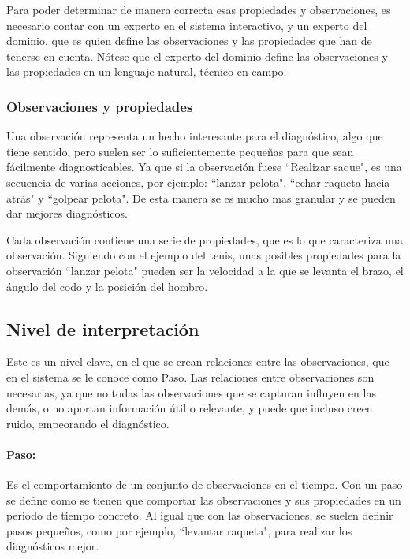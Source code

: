 Para poder determinar de manera correcta esas propiedades y observaciones, es necesario contar con un 
experto en el sistema interactivo, y un experto del dominio, que es quien define las observaciones y las
propiedades que han de tenerse en cuenta. N\'otese que el experto del dominio define las observaciones y las
propiedades en un lenguaje natural, t\'ecnico en campo.

\subsubsection{Observaciones y propiedades}
Una observaci\'on representa un hecho interesante para el diagn\'ostico, algo que tiene sentido, pero suelen
ser lo suficientemente peque\~nas para que sean f\'acilmente diagnosticables. Ya que si la observaci\'on
fuese ``Realizar saque", es una secuencia de varias acciones, por ejemplo: ``lanzar pelota", ``echar raqueta hacia atr\'as"
y ``golpear pelota". De esta manera se es mucho mas granular y se pueden dar mejores diagn\'osticos.

Cada observaci\'on contiene una serie de propiedades, que es lo que caracteriza una observaci\'on. 
Siguiendo con el ejemplo del tenis, unas posibles propiedades para la observaci\'on ``lanzar pelota"
pueden ser la velocidad a la que se levanta el brazo, el \'angulo del codo y la posici\'on del hombro.

\subsection{Nivel de interpretaci\'on}
Este es un nivel clave, en el que se crean relaciones entre las observaciones, que en el sistema se le conoce como Paso.
Las relaciones entre observaciones son necesarias, ya que no todas las observaciones que se capturan influyen en las dem\'as,
o no aportan informaci\'on \'util o relevante, y puede que incluso creen ruido, empeorando el diagn\'ostico.

\paragraph{\textbf{Paso:}}
Es el comportamiento de un conjunto de observaciones en el tiempo. Con un paso se define como se tienen
que comportar las observaciones y sus propiedades en un periodo de tiempo concreto. Al igual que con las observaciones,
se suelen definir pasos peque\~nos, como por ejemplo, ``levantar raqueta", para realizar los diagn\'osticos mejor.

